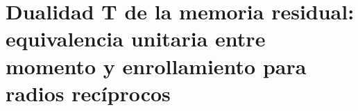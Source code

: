 \chapter{Dualidad T de la memoria residual: equivalencia unitaria entre momento y enrollamiento para radios recíprocos}
\label{chap:sucesor-102-24}
\label{chap:dualidad-t-memoria-residual}

\begingroup
\newcount\HMTFZeroEightThreeSubsection
{}
\let\HMTFZeroEightThreeOriginalSubsection\subsection
\renewcommand{\subsection}[1]{%
  \advance\HMTFZeroEightThreeSubsection by 1
  \ifnum\HMTFZeroEightThreeSubsection=3
    \HMTFZeroEightThreeOriginalSubsection{Extensión operatorial de APP: separación entre modos visibles y modos de memoria}%
  \else
    \HMTFZeroEightThreeOriginalSubsection{#1}%
  \fi
}

\endgroup


